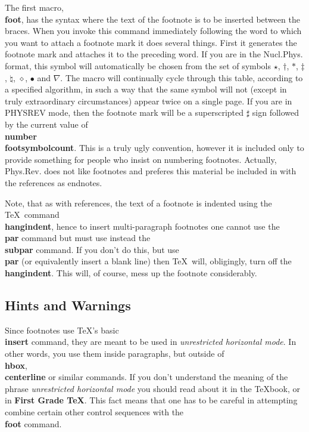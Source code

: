The first macro, {\bf \\foot}, has the syntax
where the text of the footnote is to be inserted between the
braces.
When you invoke this command immediately following the word
to which you want to attach a footnote mark it does several
things.
First it generates the footnote mark and attaches it to the
preceding word.
If you are in the Nucl.Phys. format, this symbol will automatically
be chosen from the set of symbols $\star$, $\dagger$, $\ast$,
$\ddagger$, $\natural$, $\diamond$, $\bullet$ and $\nabla$.
The macro will continually cycle through this table, according
to a specified algorithm, in such a way that the same symbol
will not (except in truly extraordinary circumstances) appear twice
on a single page.
If you are in PHYSREV mode, then the footnote mark will be a
superscripted $\sharp$ sign followed by the current value of
{\bf \\number\\footsymbolcount}.
This is a truly ugly convention, however it is included only
to provide something for people who insist on numbering footnotes.
Actually, Phys.Rev. does not like footnotes and preferes this
material be included in with the references as endnotes.
 
Note, that as with references, the text of a footnote is
indented using the \TeX\ command {\bf \\hangindent},
hence to insert multi-paragraph footnotes one cannot use the {\bf \\par}
command but must use instead the {\bf \\subpar} command.
If you don't do this, but use {\bf \\par} (or equivalently insert a
blank line) then \TeX\ will, obligingly, turn off the {\bf \\hangindent}.
This will, of course, mess up the footnote considerably.
 
\subsection{Hints and Warnings}
 
Since footnotes use \TeX 's basic {\bf \\insert} command,
they are meant to be used in {\it unrestricted horizontal mode}.
In other words, you use them inside paragraphs, but outside
of {\bf \\hbox}, {\bf \\centerline} or similar commands.
If you don't understand the meaning of the phrase {\it unrestricted
horizontal mode} you should read about it in the \TeX book,
or in {\bf First Grade \TeX }.
This fact means that one has to be careful in attempting combine
certain other control sequences with the {\bf \\foot} command.
 
